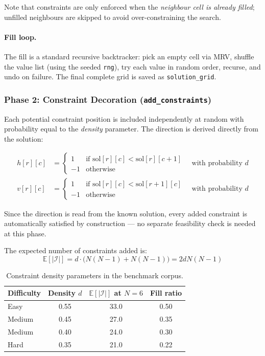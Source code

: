 Note that constraints are only enforced when the \emph{neighbour cell is already
filled}; unfilled neighbours are skipped to avoid over-constraining the search.

\paragraph{Fill loop.}
The fill is a standard recursive backtracker: pick an empty cell via MRV,
shuffle the value list (using the seeded \texttt{rng}), try each value in
random order, recurse, and undo on failure.
The final complete grid is saved as \texttt{solution\_grid}.

\subsubsection{Phase 2: Constraint Decoration (\texttt{add\_constraints})}

Each potential constraint position is included independently at random with
probability equal to the \emph{density} parameter.
The direction is derived directly from the solution:

\begin{align*}
  h[r][c] &= \begin{cases}
    1  & \text{if } \text{sol}[r][c] < \text{sol}[r][c+1] \\
    -1 & \text{otherwise}
  \end{cases}
  \quad \text{with probability } d \\
  v[r][c] &= \begin{cases}
    1  & \text{if } \text{sol}[r][c] < \text{sol}[r+1][c] \\
    -1 & \text{otherwise}
  \end{cases}
  \quad \text{with probability } d
\end{align*}

Since the direction is read from the known solution, every added constraint
is automatically satisfied by construction — no separate feasibility check
is needed at this phase.

The expected number of constraints added is:
\[
  \mathbb{E}[|\mathcal{I}|] = d \cdot \bigl(N(N-1) + N(N-1)\bigr) = 2dN(N-1)
\]

\begin{table}[h]
  \centering
  \caption{Constraint density parameters in the benchmark corpus.}
  \label{tab:density}
  \begin{tabular}{lccc}
    \toprule
    Difficulty & Density $d$ & $\mathbb{E}[|\mathcal{I}|]$ at $N=6$ & Fill ratio \\
    \midrule
    Easy   & 0.55 & 33.0 & 0.50 \\
    Medium & 0.45 & 27.0 & 0.35 \\
    Medium & 0.40 & 24.0 & 0.30 \\
    Hard   & 0.35 & 21.0 & 0.22 \\
    \bottomrule
  \end{tabular}
\end{table}

